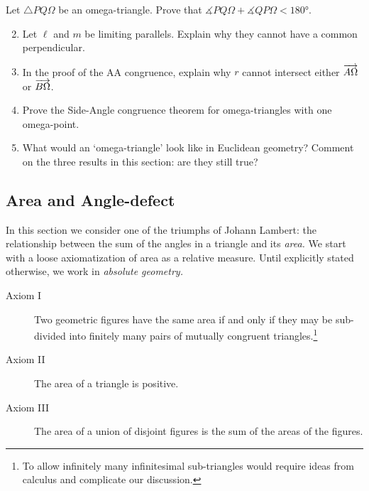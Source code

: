 \begin{exercises}
	\exstart Let $\triangle PQ\Omega$ be an omega-triangle. Prove that $\measuredangle PQ\Omega+\measuredangle QP\Omega< \ang{180}$.
	
	\begin{enumerate}\setcounter{enumi}{1}
	  \item Let $\ell$ and $m$ be limiting parallels. Explain why they cannot have a common perpendicular.
	  
	  \item\label{exs:aacongproof} In the proof of the AA congruence, explain why $r$ cannot intersect either $\overrightarrow{A\Omega}$ or $\overrightarrow{B\Omega}$.
	  
	  \item Prove the Side-Angle congruence theorem for omega-triangles with one omega-point.
	  
	  \item What would an `omega-triangle' look like in Euclidean geometry? Comment on the three results in this section: are they still true?
	\end{enumerate}
\end{exercises}

\clearpage

	

\subsection{Area and Angle-defect}\label{sec:hyparea}

In this section we consider one of the triumphs of Johann Lambert: the relationship between the sum of the angles in a triangle and its \emph{area.} We start with a loose axiomatization of area as a relative measure. Until explicitly stated otherwise, we work in \emph{absolute geometry.}

\begin{description}
	\item[Axiom I] Two geometric figures have the same area if and only if they may be sub-divided into finitely many pairs of mutually congruent triangles.\footnote{To allow infinitely many infinitesimal sub-triangles would require ideas from calculus and complicate our discussion.}
	\item[Axiom II] The area of a triangle is positive.
	\item[Axiom III] The area of a union of disjoint figures is the sum of the areas of the figures.
\end{description}

